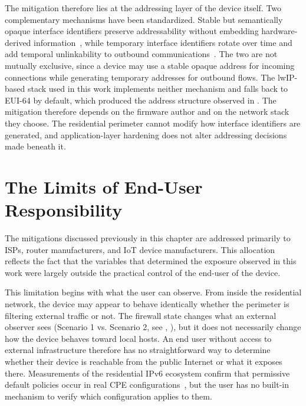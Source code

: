 The mitigation therefore lies at the addressing layer of the device itself. Two complementary mechanisms have been standardized. Stable but semantically opaque interface identifiers preserve addressability without embedding hardware-derived information~\cite{rfc7217}, while temporary interface identifiers rotate over time and add temporal unlinkability to outbound communications~\cite{rfc8981}. The two are not mutually exclusive, since a device may use a stable opaque address for incoming connections while generating temporary addresses for outbound flows. The lwIP-based stack used in this work implements neither mechanism and falls back to EUI-64 by default, which produced the address structure observed in . The mitigation therefore depends on the firmware author and on the network stack they choose. The residential perimeter cannot modify how interface identifiers are generated, and application-layer hardening does not alter addressing decisions made beneath it.

\section{The Limits of End-User Responsibility}\label{sec:user-responsibility}

The mitigations discussed previously in this chapter are addressed primarily to ISPs, router manufacturers, and IoT device manufacturers. This allocation reflects the fact that the variables that determined the exposure observed in this work were largely outside the practical control of the end-user of the device.

This limitation begins with what the user can observe. From inside the residential network, the device may appear to behave identically whether the perimeter is filtering external traffic or not. The firewall state changes what an external observer sees (Scenario 1 vs. Scenario 2, see , ), but it does not necessarily change how the device behaves toward local hosts. An end user without access to external infrastructure therefore has no straightforward way to determine whether their device is reachable from the public Internet or what it exposes there. Measurements of the residential IPv6 ecosystem confirm that permissive default policies occur in real CPE configurations~\cite{rye2025firewalls}, but the user has no built-in mechanism to verify which configuration applies to them.

